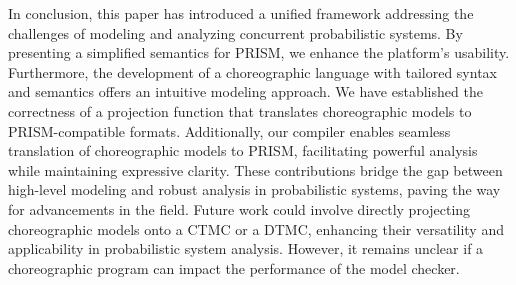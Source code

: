 In conclusion, this paper has introduced a unified framework addressing the challenges of modeling and analyzing concurrent probabilistic systems. By presenting a simplified semantics for PRISM, we enhance the platform's usability. Furthermore, the development of a choreographic language with tailored syntax and semantics offers an intuitive modeling approach. We have established the correctness of a projection function that translates choreographic models to PRISM-compatible formats. Additionally, our compiler enables seamless translation of choreographic models to PRISM, facilitating powerful analysis while maintaining expressive clarity. These contributions bridge the gap between high-level modeling and robust analysis in probabilistic systems, paving the way for advancements in the field. Future work could involve directly projecting choreographic models onto a CTMC or a DTMC, enhancing their versatility and applicability in probabilistic system analysis. However, it remains unclear if a choreographic program can impact the performance of the model checker.

